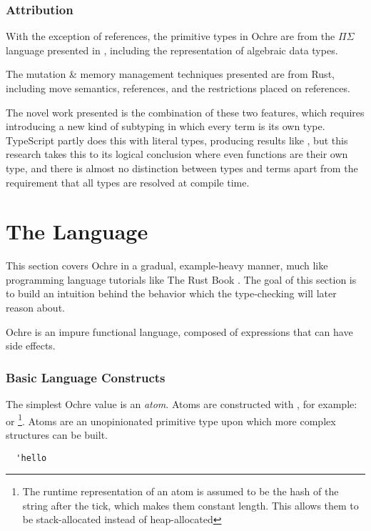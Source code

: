 \documentclass[12pt,twoside]{report}
\begin{document}
\subsubsection{Attribution}
With the exception of references, the primitive types in Ochre are from the $\Pi\Sigma$ language presented in \cite{altenkirch2010pisigma}, including the representation of algebraic data types.

The mutation \& memory management techniques presented are from Rust, including move semantics, references, and the restrictions placed on references.

The novel work presented is the combination of these two features, which requires introducing a new kind of subtyping in which every term is its own type. TypeScript partly does this with literal types, producing results like , but this research takes this to its logical conclusion where even functions are their own type, and there is almost no distinction between types and terms apart from the requirement that all types are resolved at compile time.


\cleardoublepage
\section{The Language}
\label{section:ochreexample}
This section covers Ochre in a gradual, example-heavy manner, much like programming language tutorials like The Rust Book \citep{RustProgrammingLanguagea}. The goal of this section is to build an intuition behind the behavior which the type-checking will later reason about.

Ochre is an impure functional language, composed of expressions that can have side effects.

\subsubsection{Basic Language Constructs}
The simplest Ochre value is an \textit{atom}. Atoms are constructed with , for example:  or \footnote{The runtime representation of an atom is assumed to be the hash of the string after the tick, which makes them constant length. This allows them to be stack-allocated instead of heap-allocated}. Atoms are an unopinionated primitive type upon which more complex structures can be built.

\begin{verbatim}
  'hello
\end{verbatim}
\end{document}
